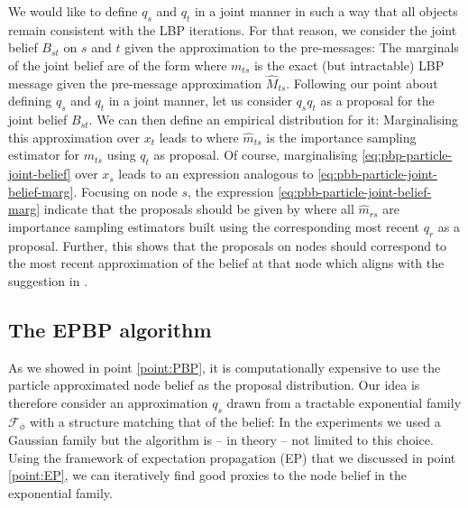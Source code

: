 We would like to define $q_{s}$ and $q_{t}$ in a joint manner in such a way that all objects remain consistent with the LBP iterations. For that reason, we consider the joint belief $ B_{st}$ on $s$ and $t$ given the approximation to the pre-messages:
%
%
The marginals of the joint belief are of the form
%
%
where $m_{ts}$ is the exact (but intractable) LBP message given the pre-message approximation $\widehat M_{ts}$.
Following our point about defining $q_{s}$ and $q_{t}$ in a joint manner, let us consider $q_{s}q_{t}$ as a proposal for the joint belief $ B_{st}$.
We can then define an empirical distribution for it:
%
%
Marginalising this approximation over $x_{t}$ leads to
%
%
where $\widehat{m}_{ts}$ is the importance sampling estimator for $ m_{ts}$ using $q_{t}$ as proposal. Of course, marginalising \eqref{eq:pbp-particle-joint-belief} over $x_{s}$ leads to an expression analogous to \eqref{eq:pbb-particle-joint-belief-marg}. Focusing on node $s$, the expression \eqref{eq:pbb-particle-joint-belief-marg} indicate that the proposals should be given by
%
where all $\widehat m_{rs}$ are importance sampling estimators built using the corresponding most recent $q_{r}$ as a proposal. Further, this shows that the proposals on nodes should correspond to the most recent approximation of the belief at that node which aligns with the suggestion in \citet{ihler09}.

\subsection{The EPBP algorithm}
As we showed in point \ref{point:PBP}, it is computationally expensive to use the particle approximated node belief as the proposal distribution. 
Our idea is therefore consider an approximation $q_{s}$ drawn from a tractable exponential family $\mathcal F_{\phi}$ with a structure matching that of the belief:
%
%
In the experiments we used a Gaussian family but the algorithm is -- in theory  -- not limited to this choice.
Using the framework of expectation propagation (EP) that we discussed in point \ref{point:EP}, we can iteratively find good proxies to the node belief in the exponential family.

